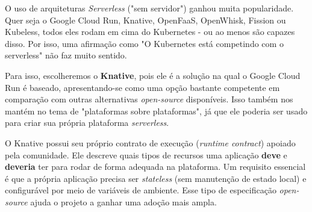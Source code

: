 \documentclass[11pt,a4paper]{article}
\begin{document}
O uso de arquiteturas \textit{Serverless} ("sem servidor") ganhou muita popularidade. Quer seja o Google Cloud Run, Knative, OpenFaaS, OpenWhisk, Fission ou Kubeless, todos eles rodam em cima do Kubernetes - ou ao menos são capazes disso. Por isso, uma afirmação como "O Kubernetes está competindo com o serverless" não faz muito sentido.

Para isso, escolheremos o \textbf{Knative}, pois ele é a solução na qual o Google Cloud Run é baseado, apresentando-se como uma opção bastante competente em comparação com outras alternativas \textit{open-source} disponíveis. Isso também nos mantém no tema de "plataformas sobre plataformas", já que ele poderia ser usado para criar sua própria plataforma \textit{serverless}.

O Knative possui seu próprio contrato de execução (\textit{runtime contract}) apoiado pela comunidade. Ele descreve quais tipos de recursos uma aplicação \textbf{deve} e \textbf{deveria} ter para rodar de forma adequada na plataforma. Um requisito essencial é que a própria aplicação precisa ser \textit{stateless} (sem manutenção de estado local) e configurável por meio de variáveis de ambiente. Esse tipo de especificação \textit{open-source} ajuda o projeto a ganhar uma adoção mais ampla.
\end{document}

